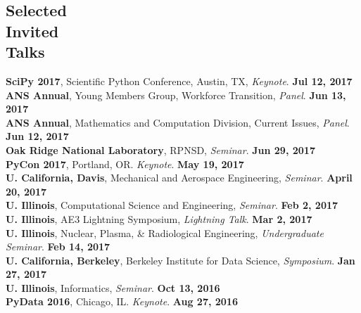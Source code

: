 \documentclass[margin,line]{resume}
\begin{document}
\begin{resume}
    \section{\mysidestyle Selected\\Invited\\Talks}
      \textbf{SciPy 2017}, Scientific Python Conference, Austin, TX, \emph{Keynote}.  \hfill\textbf{Jul 12, 2017}\\
      \textbf{ANS Annual}, Young Members Group, Workforce Transition, \emph{Panel}.  \hfill\textbf{Jun 13, 2017}\\
      \textbf{ANS Annual}, Mathematics and Computation Division, Current Issues, \emph{Panel}.  \hfill\textbf{Jun 12, 2017}\\
      \textbf{Oak Ridge National Laboratory}, RPNSD, \emph{Seminar}.  \hfill\textbf{Jun 29, 2017}\\
      \textbf{PyCon 2017}, Portland, OR. \emph{Keynote}.  \hfill\textbf{May 19, 2017}\\
      \textbf{U. California, Davis}, Mechanical and Aerospace Engineering, \emph{Seminar}.  \hfill\textbf{April 20, 2017}\\
      \textbf{U. Illinois}, Computational Science and Engineering, \emph{Seminar}.  \hfill\textbf{Feb 2, 2017}\\
      \textbf{U. Illinois}, AE3 Lightning Symposium, \emph{Lightning Talk}.  \hfill\textbf{Mar 2, 2017}\\
      \textbf{U. Illinois}, Nuclear, Plasma, \& Radiological Engineering, \emph{Undergraduate Seminar}.  \hfill\textbf{Feb 14, 2017}\\
      \textbf{U. California, Berkeley}, Berkeley Institute for Data Science, \emph{Symposium}.  \hfill\textbf{Jan 27, 2017}\\
      \textbf{U. Illinois}, Informatics, \emph{Seminar}.  \hfill\textbf{Oct 13, 2016}\\
      \textbf{PyData 2016}, Chicago, IL. \emph{Keynote}.  \hfill\textbf{Aug 27, 2016}\\

\end{resume}
\end{document}
